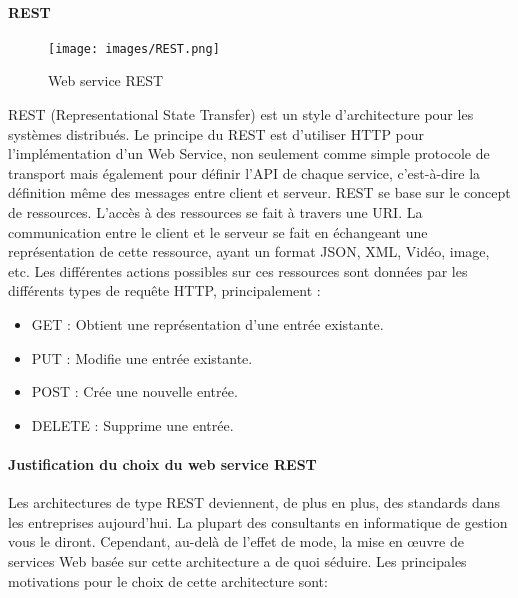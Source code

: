 {\paragraph{REST}
\begin{figure}[H]
\centering
\texttt{[image: images/REST.png]}
\caption{Web service REST\cite{rest}}
\end{figure}
REST (Representational State Transfer) est un style d'architecture pour les systèmes distribués. Le principe du REST est d'utiliser HTTP pour l'implémentation d'un Web Service, non seulement comme simple protocole de transport mais également pour définir l'API de chaque service, c'est-à-dire la définition même des messages entre client et serveur. REST se base sur le concept de ressources. L'accès à des ressources se fait à travers une URI. La communication entre le client et le serveur se fait en échangeant une représentation de cette ressource, ayant un format JSON, XML, Vidéo, image, etc. Les différentes actions possibles sur ces ressources sont données par les différents types de requête HTTP, principalement :\cite{rest}
\begin{itemize}
\item GET : Obtient une représentation d'une entrée existante.
\item PUT : Modifie une entrée existante.
\item POST : Crée une nouvelle entrée.
\item DELETE : Supprime une entrée.
\end{itemize}


\paragraph{Justification du choix du web service REST}
Les architectures de type REST deviennent, de plus en plus, des standards dans les entreprises aujourd'hui. La plupart des consultants en informatique de gestion vous le diront. Cependant, au-delà de l'effet de mode, la mise en œuvre de services Web basée sur cette architecture a de quoi séduire. Les principales motivations pour le choix de cette architecture sont:

}

